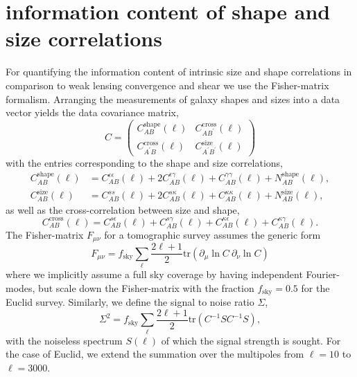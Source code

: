\documentclass[a4paper,fleqn,usenatbib]{mnras}
\begin{document}
\section{information content of shape and size correlations}\label{sect_fisher}
For quantifying the information content of intrinsic size and shape correlations in comparison to weak lensing convergence and shear we use the Fisher-matrix formalism. Arranging the measurements of galaxy shapes and sizes into a data vector yields the data covariance matrix,
\begin{equation}
C =
\left(
\begin{array}{cc}
C^\mathrm{shape}_{AB}(\ell) & C^\mathrm{cross}_{AB^\prime}(\ell) \\
C^\mathrm{cross}_{A^\prime B}(\ell) & C^\mathrm{size}_{A^\prime B^\prime}(\ell)
\end{array}
\right)
\end{equation}
with the entries corresponding to the shape and size correlations,
\begin{align}
C^\mathrm{shape}_{AB}(\ell) & = C^{\epsilon\epsilon}_{AB}(\ell) + 2C^{\epsilon\gamma}_{AB}(\ell) + C^{\gamma\gamma}_{AB}(\ell) + N^\mathrm{shape}_{AB}(\ell),\\
C^\mathrm{size}_{AB}(\ell) & = C^{ss}_{AB}(\ell) + 2C^{s\kappa}_{AB}(\ell) + C^{\kappa\kappa}_{AB}(\ell) + N^\mathrm{size}_{AB}(\ell),
\end{align}
as well as the cross-correlation between size and shape,
\begin{equation}
C^\mathrm{cross}_{AB}(\ell) = C^{s\epsilon}_{AB}(\ell) + C^{s\gamma}_{AB}(\ell) + C^{\kappa\epsilon}_{AB}(\ell) + C^{\kappa\gamma}_{AB}(\ell).
\end{equation}
The Fisher-matrix $F_{\mu\nu}$ for a tomographic survey assumes the generic form
\begin{equation}
F_{\mu\nu} = f_\mathrm{sky}\sum_\ell\frac{2\ell+1}{2}\mathrm{tr}\left(\partial_\mu\ln C\:\partial_\nu\ln C\right)
\end{equation}
where we implicitly assume a full sky coverage by having independent Fourier-modes, but scale down the Fisher-matrix with the fraction $f_\mathrm{sky} = 0.5$ for the Euclid survey. Similarly, we define the signal to noise ratio $\Sigma$,
\begin{equation}
\Sigma^2 = f_\mathrm{sky}\sum_\ell\frac{2\ell+1}{2}\mathrm{tr}\left(C^{-1}SC^{-1}S\right),
\end{equation}
with the noiseless spectrum $S(\ell)$ of which the signal strength is sought. For the case of Euclid, we extend the summation over the multipoles from $\ell=10$ to $\ell=3000$.
\end{document}
